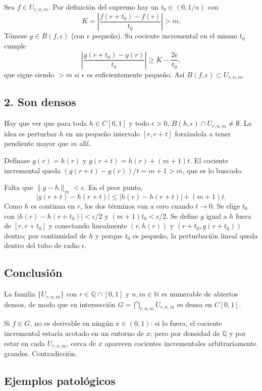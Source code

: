 \documentclass[11pt, a4paper]{article}
\begin{document}
Sea $f \in U_{r,n,m}$. Por definición del supremo hay un $t_0 \in (0, 1/n)$ con
$$ K = \left| \frac{f(r+t_0) - f(r)}{t_0} \right| > m. $$
Tómese $g \in B(f, \epsilon)$ (con $\epsilon$ pequeño). Su cociente incremental en el mismo $t_0$
cumple
$$ \left| \frac{g(r+t_0) - g(r)}{t_0} \right| \ge K - \frac{2\epsilon}{t_0}, $$
que sigue siendo $> m$ si $\epsilon$ es suficientemente pequeño. Así $B(f, \epsilon) \subset U_{r,n,m}$.

\subsection*{2. Son densos}

Hay que ver que para toda $h \in C[0,1]$ y todo $\epsilon > 0$,
$B(h, \epsilon) \cap U_{r,n,m} \ne \emptyset$. La idea es perturbar $h$ en un pequeño intervalo
$[r, r+t]$ forzándola a tener pendiente mayor que $m$ allí.

Defínase $g(r) = h(r)$ y $g(r+t) = h(r) + (m+1)t$. El cociente incremental queda
$(g(r+t) - g(r))/t = m+1 > m$, que es lo buscado.

Falta que $\|g - h\|_\infty < \epsilon$. En el peor punto,
$$ |g(r+t) - h(r+t)| \le |h(r) - h(r+t)| + (m+1)t. $$
Como $h$ es continua en $r$, los dos términos van a cero cuando $t \to 0$. Se elige $t_0$ con
$|h(r) - h(r+t_0)| < \epsilon/2$ y $(m+1)t_0 < \epsilon/2$. Se define $g$ igual a $h$ fuera de
$[r, r+t_0]$ y conectando linealmente $(r, h(r))$ y $(r+t_0, g(r+t_0))$ dentro; por continuidad de
$h$ y porque $t_0$ es pequeño, la perturbación lineal queda dentro del tubo de radio $\epsilon$.

\subsection*{Conclusión}

La familia $\{U_{r,n,m}\}$ con $r \in \mathbb{Q} \cap [0,1]$ y $n, m \in \mathbb{N}$ es numerable de
abiertos densos, de modo que su intersección $G = \bigcap_{r, n, m} U_{r,n,m}$ es densa en $C[0,1]$.

Si $f \in G$, no es derivable en ningún $x \in (0,1)$: si lo fuera, el cociente incremental
estaría acotado en un entorno de $x$; pero por densidad de $\mathbb{Q}$ y por estar en cada
$U_{r,n,m}$, cerca de $x$ aparecen cocientes incrementales arbitrariamente grandes. Contradicción.

\subsection{Ejemplos patológicos}
\end{document}
